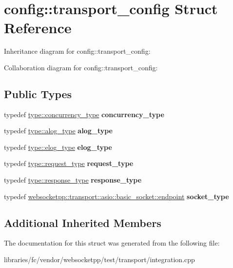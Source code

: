 \hypertarget{structconfig_1_1transport__config}{}\section{config\+:\+:transport\+\_\+config Struct Reference}
\label{structconfig_1_1transport__config}


Inheritance diagram for config\+:\+:transport\+\_\+config\+:


Collaboration diagram for config\+:\+:transport\+\_\+config\+:
\subsection*{Public Types}
\begin{DoxyCompactItemize}
\item 
\mbox{\label{structconfig_1_1transport__config_a688f6afc4c2c3d28d4e753c2332e7fae}} 
typedef \mbox{\hyperlink{classwebsocketpp_1_1concurrency_1_1none}{type\+::concurrency\+\_\+type}} {\bfseries concurrency\+\_\+type}
\item 
\mbox{\label{structconfig_1_1transport__config_a22470a78475a07398a2552060add0345}} 
typedef \mbox{\hyperlink{classwebsocketpp_1_1log_1_1stub}{type\+::alog\+\_\+type}} {\bfseries alog\+\_\+type}
\item 
\mbox{\label{structconfig_1_1transport__config_a608fa7de7c01b30d2a4525a80be73509}} 
typedef \mbox{\hyperlink{classwebsocketpp_1_1log_1_1stub}{type\+::elog\+\_\+type}} {\bfseries elog\+\_\+type}
\item 
\mbox{\label{structconfig_1_1transport__config_a6f30f84091e0b3ed0a2c458173558b93}} 
typedef \mbox{\hyperlink{classwebsocketpp_1_1http_1_1parser_1_1request}{type\+::request\+\_\+type}} {\bfseries request\+\_\+type}
\item 
\mbox{\label{structconfig_1_1transport__config_a9c250a4f054f597bb7a11d6cd3424ac1}} 
typedef \mbox{\hyperlink{classwebsocketpp_1_1http_1_1parser_1_1response}{type\+::response\+\_\+type}} {\bfseries response\+\_\+type}
\item 
\mbox{\label{structconfig_1_1transport__config_ab3c546f6bc6184659f5b14004b17e856}} 
typedef \mbox{\hyperlink{classwebsocketpp_1_1transport_1_1asio_1_1basic__socket_1_1endpoint}{websocketpp\+::transport\+::asio\+::basic\+\_\+socket\+::endpoint}} {\bfseries socket\+\_\+type}
\end{DoxyCompactItemize}
\subsection*{Additional Inherited Members}


The documentation for this struct was generated from the following file\+:\begin{DoxyCompactItemize}
\item 
libraries/fc/vendor/websocketpp/test/transport/integration.\+cpp\end{DoxyCompactItemize}
